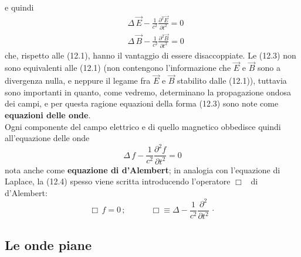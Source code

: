 e quindi
\begin{equation}
  \begin{aligned}
    &\Delta\,\vec E-\frac{1}{c^2}\frac{\partial^2\vec E}{\partial t^2}=0\\
    &\Delta\,\vec B-\frac{1}{c^2}\frac{\partial^2\vec B}{\partial t^2}=0
  \end{aligned}
  \tag{12.3}
\end{equation}
che, rispetto alle (12.1), hanno il vantaggio di essere disaccoppiate. Le (12.3)
non sono equivalenti alle (12.1) \big(non contengono l'informazione che $\vec E$
e $\vec B$ sono a divergenza nulla, e neppure il legame fra $\vec E$ e $\vec B$
stabilito dalle (12.1)\big), tuttavia sono importanti in quanto, come vedremo,
determinano la propagazione ondosa dei campi, e per questa ragione equazioni
della forma (12.3) sono note come \textbf{equazioni delle onde}.\\
Ogni componente del campo elettrico e di quello magnetico obbedisce quindi
all'equazione delle onde
\begin{equation}
  \Delta\,f-\frac{1}{c^2}\frac{\partial^2f}{\partial t^2}=0
  \tag{12.4}
\end{equation}
nota anche come \textbf{equazione di d'Alembert}; in analogia con l'equazione di
Laplace, la (12.4) spesso viene scritta introducendo l'operatore $\Box$ \ di
d'Alembert:
\begin{equation}
  \Box\,f=0\,;\qquad\quad\Box\equiv\Delta
  -\frac{1}{c^2}\frac{\partial^2}{\partial t^2}\,\cdot
  \tag{12.4'}
\end{equation}

\subsection{Le onde piane}


